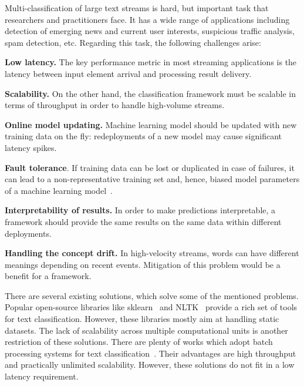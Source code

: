 \label {fs-short-intro}

Multi-classification of large text streams is hard, but important task that researchers and practitioners face. It has a wide range of applications including detection of emerging news and current user interests, suspicious traffic analysis, spam detection, etc. Regarding this task, the following challenges arise:

\textbf{Low latency.} The key performance metric in most streaming applications is the latency between input element arrival and processing result delivery.

\textbf{Scalability.} On the other hand, the classification framework must be scalable in terms of throughput in order to handle high-volume streams.

\textbf{Online model updating.} Machine learning model should be updated with new training data on the fly: redeployments of a new model may cause significant latency spikes.

\textbf{Fault tolerance}. If training data can be lost or duplicated in case of failures, it can lead to a non-representative training set and, hence, biased model parameters of a machine learning model~\cite{Baylor:2017:TTP:3097983.3098021}.

\textbf{Interpretability of results.} In order to make predictions interpretable, a framework should provide the same results on the same data within different deployments.

\textbf{Handling the concept drift.} In high-velocity streams, words can have different meanings depending on recent events. Mitigation of this problem would be a benefit for a framework.

There are several existing solutions, which solve some of the mentioned problems. Popular open-source libraries like sklearn~\cite{sklearn_api} and NLTK~\cite{bird2009natural} provide a rich set of tools for text classification. However, these libraries mostly aim at handling static datasets. The lack of scalability across multiple computational units is another restriction of these solutions. There are plenty of works which adopt batch processing systems for text classification~\cite{semberecki2016distributed, svyatkovskiy2016large, baltas2016apache, Nodarakis2016LargeSS}. Their advantages are high throughput and practically unlimited scalability. However, these solutions do not fit in a low latency requirement.

